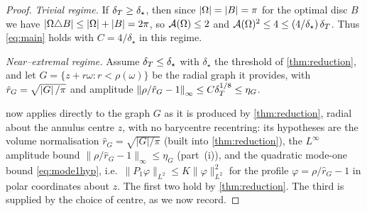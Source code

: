\begin{proof}
\emph{Trivial regime.} If $\delta_T\ge\delta_\star$, then since $\left\lvert\Omega\right\rvert=\left\lvert B\right\rvert=\pi$
for the optimal disc $B$ we have $\left\lvert\Omega\triangle B\right\rvert\le\left\lvert\Omega\right\rvert+\left\lvert B\right\rvert=2\pi$,
so $\mathcal{A}(\Omega)\le2$ and
$\mathcal{A}(\Omega)^2\le4\le(4/\delta_\star)\,\delta_T$. Thus \eqref{eq:main} holds with
$C=4/\delta_\star$ in this regime.

\emph{Near--extremal regime.} Assume $\delta_T\le\delta_\star$ with $\delta_\star$
the threshold of \cref{thm:reduction}, and let $G=\{z+r\omega:r<\rho(\omega)\}$
be the radial graph it provides, with $\hat r_G=\sqrt{\left\lvert G\right\rvert/\pi}$ and
amplitude $\left\lVert\rho/\hat r_G-1\right\rVert_\infty\le C\delta_T^{1/8}\le\eta_G$.

 now applies directly to the graph $G$ as it is produced by
\cref{thm:reduction}, radial about the annulus centre $z$, with no
barycentre recentring: its hypotheses are the volume normalisation
$\hat r_G=\sqrt{|G|/\pi}$ (built into \cref{thm:reduction}), the $L^\infty$
amplitude bound $\|\rho/\hat r_G-1\|_\infty\le\eta_G$ (part~(i)), and the
quadratic mode-one bound \eqref{eq:mode1hyp}, i.e.\ $\|P_1\varphi\|_{L^2}\le
K\|\varphi\|_{L^2}^2$ for the profile $\varphi=\rho/\hat r_G-1$ in polar
coordinates about $z$. The first two hold by \cref{thm:reduction}. The third
is supplied by the choice of centre, as we now record.


\end{proof}
